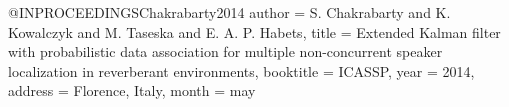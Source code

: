 @INPROCEEDINGS{Chakrabarty2014
    author = {S. Chakrabarty and K. Kowalczyk and M. Taseska and E. A. P. Habets},
    title = {Extended {K}alman filter with probabilistic data association for multiple non-concurrent speaker localization in reverberant environments},
    booktitle = ICASSP,
    year = {2014},
    address = {Florence, Italy},
    month = may
}